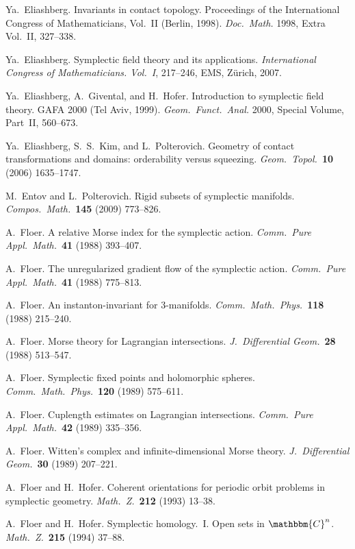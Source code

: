 \documentclass[12pt,twoside]{amsart}
\theoremstyle{plain}
\numberwithin{figure}{section}
\numberwithin{equation}{section}
\def\CC{\mathbbm{C}}
\begin{document}
\begin{thebibliography}{999}
Ya.\ Eliashberg.
Invariants in contact topology. 
Proceedings of the International Congress of Mathematicians, Vol.\ II (Berlin, 1998). 
{\it Doc.\ Math.} 1998, 
Extra Vol.\ II, 327--338.

Ya.\ Eliashberg.
Symplectic field theory and its applications. 
{\it International Congress of Mathematicians. Vol.\ I}, 217--246, 
EMS, Z\"urich, 2007.

Ya.\ Eliashberg, A.\  Givental, and H.\ Hofer.
Introduction to symplectic field theory.
GAFA 2000 (Tel Aviv, 1999).
{\it Geom.\ Funct.\ Anal.} 2000, Special Volume, Part~II, 560--673. 

Ya.\ Eliashberg, S.\ S.\ Kim, and L.\ Polterovich.
Geometry of contact transformations and domains: orderability versus squeezing. 
{\it Geom.\ Topol.}~{\bf 10} (2006) 1635--1747. 

M.\ Entov and L.\ Polterovich.
Rigid subsets of symplectic manifolds. 
{\it Compos.\ Math.}~{\bf 145} (2009) 773--826. 

A.\ Floer.
A relative Morse index for the symplectic action. 
{\it Comm.\ Pure Appl.\ Math.}~{\bf 41} (1988) 393--407. 

A.\ Floer.
The unregularized gradient flow of the symplectic action. 
{\it Comm.\ Pure Appl.\ Math.}~{\bf 41} (1988) 775--813. 

A.\ Floer.
An instanton-invariant for 3-manifolds. 
{\it Comm.\ Math.\ Phys.}~{\bf 118} (1988) 215--240.


A.\ Floer.
Morse theory for Lagrangian intersections. 
{\it J.\ Differential Geom.}~{\bf 28} (1988) 513--547.

A.\ Floer.
Symplectic fixed points and holomorphic spheres. 
{\it Comm.\ Math.\ Phys.}~{\bf 120} (1989) 575--611.

A.\ Floer.
Cuplength estimates on Lagrangian intersections.
{\it Comm.\ Pure Appl.\ Math.}~{\bf 42} (1989) 335--356. 

A.\ Floer.
Witten's complex and infinite-dimensional Morse theory. 
{\it J.\ Differential Geom.}~{\bf 30} (1989) 207--221. 

A.\ Floer and H.\ Hofer.
Coherent orientations for periodic orbit problems in symplectic geometry.
{\it Math.\ Z.}~{\bf 212} (1993) 13--38.

A.\ Floer and H.\ Hofer. 
Symplectic homology.\ I. Open sets in $\CC^n$. 
{\it Math.\ Z.}~{\bf 215} (1994) 37--88.


\end{thebibliography}
\end{document}
